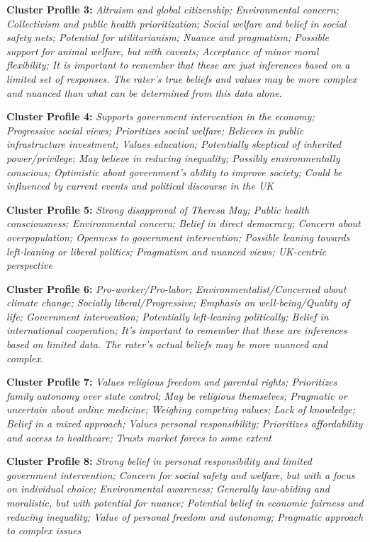 \documentclass[11pt]{article}
\newcommand{\profiletext}[1]{\textit{#1}}
\begin{document}
\textbf{Cluster Profile 3:} \profiletext{Altruism and global citizenship; Environmental concern; Collectivism and public health prioritization; Social welfare and belief in social safety nets; Potential for utilitarianism; Nuance and pragmatism; Possible support for animal welfare, but with caveats; Acceptance of minor moral flexibility; It is important to remember that these are just inferences based on a limited set of responses. The rater's true beliefs and values may be more complex and nuanced than what can be determined from this data alone.}

\textbf{Cluster Profile 4:} \profiletext{Supports government intervention in the economy; Progressive social views; Prioritizes social welfare; Believes in public infrastructure investment; Values education; Potentially skeptical of inherited power/privilege; May believe in reducing inequality; Possibly environmentally conscious; Optimistic about government's ability to improve society; Could be influenced by current events and political discourse in the UK}

\textbf{Cluster Profile 5:} \profiletext{Strong disapproval of Theresa May; Public health consciousness; Environmental concern; Belief in direct democracy; Concern about overpopulation; Openness to government intervention; Possible leaning towards left-leaning or liberal politics; Pragmatism and nuanced views; UK-centric perspective}

\textbf{Cluster Profile 6:} \profiletext{Pro-worker/Pro-labor; Environmentalist/Concerned about climate change; Socially liberal/Progressive; Emphasis on well-being/Quality of life; Government intervention; Potentially left-leaning politically; Belief in international cooperation; It's important to remember that these are inferences based on limited data.  The rater's actual beliefs may be more nuanced and complex.}

\textbf{Cluster Profile 7:} \profiletext{Values religious freedom and parental rights; Prioritizes family autonomy over state control; May be religious themselves; Pragmatic or uncertain about online medicine; Weighing competing values; Lack of knowledge; Belief in a mixed approach; Values personal responsibility; Prioritizes affordability and access to healthcare; Trusts market forces to some extent}

\textbf{Cluster Profile 8:} \profiletext{Strong belief in personal responsibility and limited government intervention; Concern for social safety and welfare, but with a focus on individual choice; Environmental awareness; Generally law-abiding and moralistic, but with potential for nuance; Potential belief in economic fairness and reducing inequality; Value of personal freedom and autonomy; Pragmatic approach to complex issues}
\end{document}
